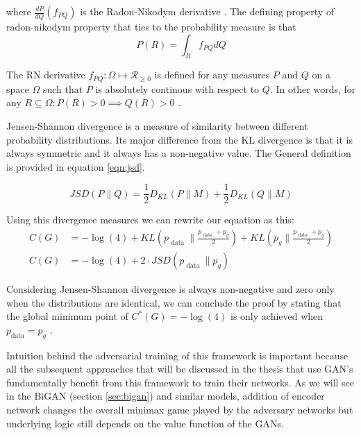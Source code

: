 where $\frac{d P}{dQ} (f_{PQ})$ is the Radon-Nikodym derivative \cite{Bill86}. The defining property of
radon-nikodym property that ties to the probability measure is that 
\begin{equation}
    \label{eqn:radon}
    P(R) = \int_{R} f_{PQ} d Q
\end{equation}

The RN derivative $f_{PQ} : \Omega \mapsto \mathcal{R}_{\geq 0}$ is defined for any measures $P$ and
$Q$ on a space $\Omega$ such that $P$ is absolutely continous with respect to $Q$. In other words,
for any $ R \subseteq  \Omega : P(R) > 0 \implies Q(R) > 0$ . \cite{Bill86}

\begin{definition}
    
Jensen-Shannon divergence is a measure of similarity between different probability
distributions. Its major difference from the KL divergence is that it is always symmetric and it
always has a non-negative value. The General definition is provided in equation \ref{eqn:jsd}.
\end{definition}

\begin{equation}
    \label{eqn:jsd}
    J S D(P \| Q)=\frac{1}{2} D_{K L}(P \| M)+\frac{1}{2} D_{K L}(Q \| M)
\end{equation}

Using this divergence measures we can rewrite our equation as this:
\begin{align}
    \label{eqn:gan_eqaul}
    C(G)&=-\log (4)+K L\left(p_{\text { data }} \| \frac{p_{\text { data }}+p_{g}}{2}\right)+K L\left(p_{g} \| \frac{p_{\text { data }}+p_{g}}{2}\right) \\
    C(G)&=-\log (4)+2 \cdot J S D\left(p_{\text { data }} \| p_{g}\right)
\end{align}

Considering Jensen-Shannon divergence is always non-negative and zero only when the distributions
are identical, we can conclude the proof by stating that the global minimum point of $C^*(G) = -
\log(4)$ is only achieved when $p_{\text{data}} = p_g$ .

Intuition behind the adversarial training of this framework is important because all the subsequent
approaches that will be discussed in the thesis that use GAN's fundamentally benefit from this
framework to train their networks. As we will see in the BiGAN (section \ref{sec:bigan}) and similar models, addition of
encoder network changes the overall minimax game played by the adversary networks but underlying
logic still depends on the value function of the GANs.

